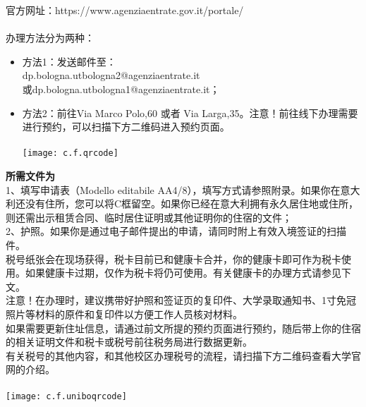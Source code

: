 官方网址：https://www.agenziaentrate.gov.it/portale/\\
\\
办理方法分为两种：
\begin{itemize}
\item 方法1：发送邮件至：\\
dp.bologna.utbologna2@agenziaentrate.it\\
或dp.bologna.utbologna1@agenziaentrate.it；
\item 方法2：前往Via Marco Polo,60 或者 Via Larga,35。注意！前往线下办理需要进行预约，可以扫描下方二维码进入预约页面。\\
\\
\texttt{[image: c.f.qrcode]}\\
\end{itemize}
\textbf{所需文件为}\\
1、填写申请表（Modello editabile AA4/8），填写方式请参照附录。如果你在意大利还没有住所，您可以将C框留空。如果你已经在意大利拥有永久居住地或住所，则还需出示租赁合同、临时居住证明或其他证明你的住宿的文件；\\
2、护照。如果你是通过电子邮件提出的申请，请同时附上有效入境签证的扫描件。
\\

税号纸张会在现场获得，税卡目前已和健康卡合并，你的健康卡即可作为税卡使用。如果健康卡过期，仅作为税卡将仍可使用。有关健康卡的办理方式请参见下文。\\
注意！在办理时，建议携带好护照和签证页的复印件、大学录取通知书、1寸免冠照片等材料的原件和复印件以方便工作人员核对材料。\\
如果需要更新住址信息，请通过前文所提的预约页面进行预约，随后带上你的住宿的相关证明文件和税卡或税号前往税务局进行数据更新。\\
有关税号的其他内容，和其他校区办理税号的流程，请扫描下方二维码查看大学官网的介绍。\\
\\
\texttt{[image: c.f.uniboqrcode]}\\
